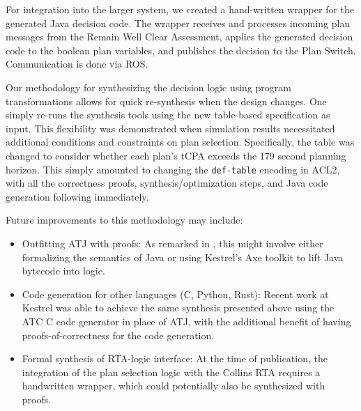 For integration into the larger system, we created a hand-written wrapper for the generated Java decision code.  The wrapper receives and processes incoming plan messages from the Remain Well Clear Assessment, applies the generated decision code to the boolean plan variables, and publishes the decision to the Plan Switch.  Communication is done via ROS.

Our methodology for synthesizing the decision logic using program transformations allows for quick re-synthesis when the design changes.  One simply re-runs the synthesis tools using the new table-based specification as input.  This flexibility was demonstrated when simulation results necessitated additional conditions and constraints on plan selection.  Specifically, the table was changed to consider whether each plan's tCPA exceeds the 179 second planning horizon. This simply amounted to changing the \texttt{def-table} encoding in ACL2, with all the correctness proofs, synthesis/optimization steps, and Java code generation following immediately.

Future improvements to this methodology may include:
\begin{itemize}
\item Outfitting ATJ with proofs: As remarked in \cite{dasc2020}, this might involve either formalizing the semantics of Java or using Kestrel's Axe toolkit to lift Java bytecode into logic.
\item Code generation for other languages (C, Python, Rust): Recent work at Kestrel was able to achieve the same synthesis presented above using the ATC C code generator\cite{atc} in place of ATJ, with the additional benefit of having proofs-of-correctness for the code generation.
\item Formal synthesis of RTA-logic interface: At the time of publication, the integration of the plan selection logic with the Collins RTA requires a handwritten wrapper, which could potentially also be synthesized with proofs.
\end{itemize}
